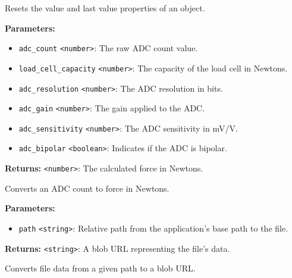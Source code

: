 \documentclass[12pt,a4paper]{article}
\begin{document}
\noindent Resets the value and last value properties of an object.

\vspace{5mm}
\noindent {}


\noindent \textbf{Parameters:}
\begin{itemize}
  \item \texttt{adc\_count} \texttt{<number>}: The raw ADC count value.
  \item \texttt{load\_cell\_capacity} \texttt{<number>}: The capacity of the load cell in Newtons.
  \item \texttt{adc\_resolution} \texttt{<number>}: The ADC resolution in bits.
  \item \texttt{adc\_gain} \texttt{<number>}: The gain applied to the ADC.
  \item \texttt{adc\_sensitivity} \texttt{<number>}: The ADC sensitivity in mV/V.
  \item \texttt{adc\_bipolar} \texttt{<boolean>}: Indicates if the ADC is bipolar.
\end{itemize}

\noindent \textbf{Returns:} \texttt{<number>}: The calculated force in Newtons.

\noindent Converts an ADC count to force in Newtons.

\vspace{5mm}
\noindent {}


\noindent \textbf{Parameters:}
\begin{itemize}
  \item \texttt{path} \texttt{<string>}: Relative path from the application's base path to the file.
\end{itemize}

\noindent \textbf{Returns:} \texttt{<string>}: A blob URL representing the file's data.

\noindent Converts file data from a given path to a blob URL.

\vspace{5mm}
\noindent {}
\end{document}
